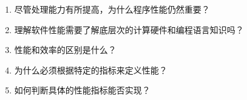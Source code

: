 \begin{enumerate}
\item 尽管处理能力有所提高，为什么程序性能仍然重要？
\item 理解软件性能需要了解底层次的计算硬件和编程语言知识吗？
\item 性能和效率的区别是什么？
\item 为什么必须根据特定的指标来定义性能？
\item 如何判断具体的性能指标能否实现？
\end{enumerate}